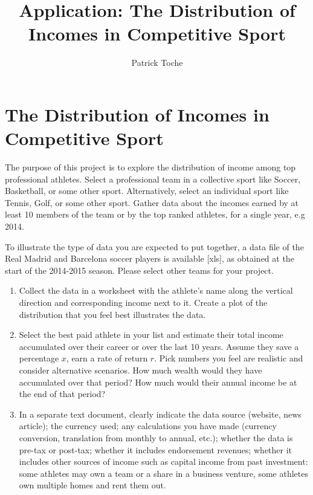 \documentclass[a4,12pt]{article}%
\title{Application: The Distribution of Incomes in Competitive Sport}
\author{Patrick Toche}
\date{}
\begin{document}
\maketitle

\newpage



\section*{The Distribution of Incomes in Competitive Sport}

The purpose of this project is to explore the distribution of income among top professional athletes. Select a professional team in a collective sport like Soccer, Basketball, or some other sport. Alternatively, select an individual sport like Tennis, Golf, or some other sport. Gather data about the incomes earned by at least 10 members of the team or by the top ranked athletes, for a single year, e.g 2014. 

To illustrate the type of data you are expected to put together, a data file of the Real Madrid and Barcelona soccer players is available [xls], as obtained at the start of the 2014-2015 season. Please select other teams for your project.

\begin{enumerate}

\item 
Collect the data in a worksheet with the athlete's name along the vertical direction and corresponding income next to it. Create a plot of the distribution that you feel best illustrates the data.

\item 
Select the best paid athlete in your list and estimate their total income accumulated over their career or over the last 10 years. Assume they save a percentage $x$, earn a rate of return $r$. Pick numbers you feel are realistic and consider alternative scenarios. How much wealth would they have accumulated over that period? How much would their annual income be at the end of that period? 

\item
In a separate text document, clearly indicate the data source (website, news article); the currency used; any calculations you have made (currency conversion, translation from monthly to annual, etc.); whether the data is pre-tax or post-tax; whether it includes endorsement revenues; whether it includes other sources of income such as capital income from past investment: some athletes may own a team or a share in a business venture, some athletes own multiple homes and rent them out.

\end{enumerate}
\end{document}
